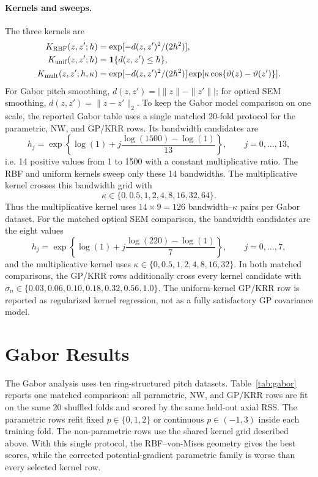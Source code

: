 \documentclass[10pt]{article}
\begin{document}
\paragraph{Kernels and sweeps.}
The three kernels are
\begin{align}
  K_{\rm RBF}(z,z';h)&=\exp[-d(z,z')^2/(2h^2)],\\
  K_{\rm unif}(z,z';h)&=\mathbf 1\{d(z,z')\le h\},\\
  K_{\rm mult}(z,z';h,\kappa)&=
  \exp[-d(z,z')^2/(2h^2)]\exp[\kappa\cos\{\vartheta(z)-\vartheta(z')\}].
\end{align}
For Gabor pitch smoothing, $d(z,z')=|\|z\|-\|z'\||$; for optical SEM smoothing, $d(z,z')=\|z-z'\|_2$.  To keep the Gabor model comparison on one scale, the reported Gabor table uses a single matched 20-fold protocol for the parametric, NW, and GP/KRR rows.  Its bandwidth candidates are
\[
  h_j=\exp\!\left\{\log(1)+j\frac{\log(1500)-\log(1)}{13}\right\},
  \qquad j=0,\ldots,13,
\]
i.e. 14 positive values from 1 to 1500 with a constant multiplicative ratio.  The RBF and uniform kernels sweep only these 14 bandwidths.  The multiplicative kernel crosses this bandwidth grid with
\[
  \kappa\in\{0,0.5,1,2,4,8,16,32,64\}.
\]
Thus the multiplicative kernel uses $14\times9=126$ bandwidth--$\kappa$ pairs per Gabor dataset.  For the matched optical SEM comparison, the bandwidth candidates are the eight values
\[
  h_j=\exp\!\left\{\log(1)+j\frac{\log(220)-\log(1)}{7}\right\},
  \qquad j=0,\ldots,7,
\]
and the multiplicative kernel uses $\kappa\in\{0,0.5,1,2,4,8,16,32\}$.  In both matched comparisons, the GP/KRR rows additionally cross every kernel candidate with
$\sigma_n\in\{0.03,0.06,0.10,0.18,0.32,0.56,1.0\}$.  The uniform-kernel GP/KRR row is reported as regularized kernel regression, not as a fully satisfactory GP covariance model.

\section{Gabor Results}
The Gabor analysis uses ten ring-structured pitch datasets.  Table~\ref{tab:gabor} reports one matched comparison: all parametric, NW, and GP/KRR rows are fit on the same 20 shuffled folds and scored by the same held-out axial RSS.  The parametric rows refit fixed $p\in\{0,1,2\}$ or continuous $p\in(-1,3)$ inside each training fold.  The non-parametric rows use the shared kernel grid described above.  With this single protocol, the RBF--von-Mises geometry gives the best scores, while the corrected potential-gradient parametric family is worse than every selected kernel row.
\end{document}
